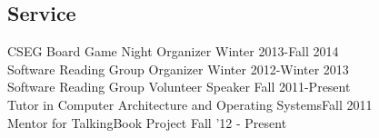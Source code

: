 \documentclass[margin, 10pt]{res} %
\begin{document}
\begin{resume}
\section{Service}
CSEG Board Game Night Organizer \hfill Winter 2013-Fall 2014 \\
Software Reading Group Organizer \hfill Winter 2012-Winter 2013 \\
Software Reading Group Volunteer Speaker \hfill Fall 2011-Present \\
Tutor in Computer Architecture and Operating Systems\hfill Fall 2011 \\
Mentor for TalkingBook Project \hfill Fall '12 - Present \\

\end{resume}
\end{document}
